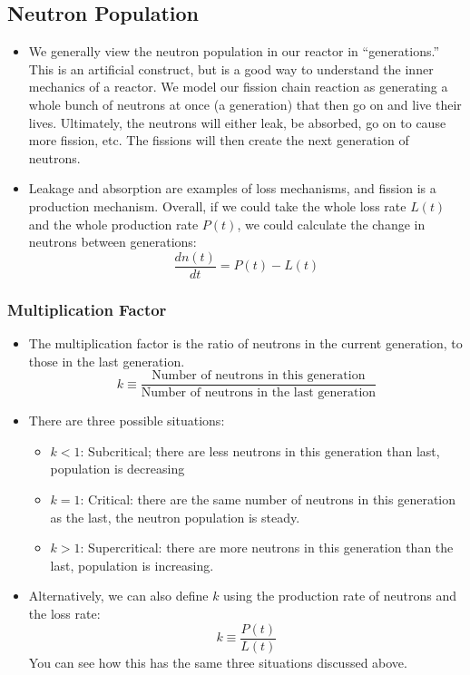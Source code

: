 \documentclass[letter]{article}
\begin{document}
\subsection{Neutron Population}
\begin{itemize}
\item We generally view the neutron population in our reactor in
  ``generations.'' This is an artificial construct, but is a good way
  to understand the inner mechanics of a reactor. We model our fission
  chain reaction as generating a whole bunch of neutrons at once (a
  generation) that then go on and live their lives. Ultimately, the
  neutrons will either leak, be absorbed, go on to cause more
  fission, etc. The fissions will then create the next generation of
  neutrons.
\item Leakage and absorption are examples of loss mechanisms, and
  fission is a production mechanism. Overall, if we could take the
  whole loss rate $L(t)$ and the whole production rate $P(t)$, we
  could calculate the change in neutrons between generations:
  \begin{equation*}
    \frac{dn(t)}{dt}=P(t)-L(t)
  \end{equation*}
\end{itemize}

\subsubsection{Multiplication Factor}

\begin{itemize}
\item The multiplication factor is the ratio of neutrons in the
  current generation, to those in the last
  generation.\cite[Lec. 10]{lecture}
  \begin{equation*}
    k\equiv\frac{\text{Number of neutrons in this generation}}{\text{Number
        of neutrons in the last generation}}
  \end{equation*}
\item There are three possible situations\cite[Lec. 10]{lecture}:
  \begin{itemize}
  \item[] $k < 1$: Subcritical; there are less neutrons in this
    generation than last, population is decreasing
  \item[] $k=1$: Critical: there are the same number of neutrons in
    this generation as the last, the neutron population is steady.
  \item[] $k>1$: Supercritical: there are more neutrons in this
    generation than the last, population is increasing.
  \end{itemize}
\item Alternatively, we can also define $k$ using the production rate
  of neutrons and the loss rate:
  \begin{equation*}
    k\equiv\frac{P(t)}{L(t)}
  \end{equation*}
You can see how this has the same three situations discussed
above.\cite[Lec. 10]{lecture}
\end{itemize}
\end{document}
